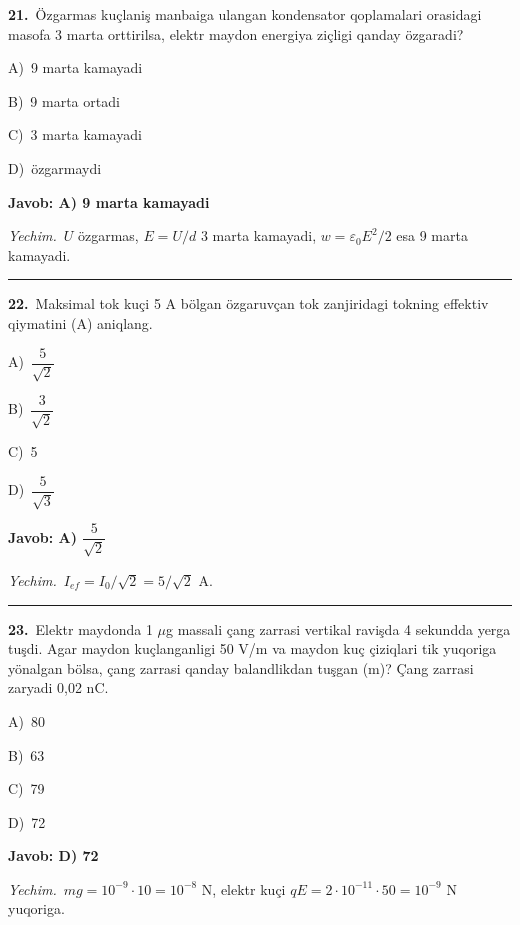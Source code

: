\documentclass[11pt,a4paper]{article}
\newcommand{\opt}[2]{\hspace*{4mm}#1)\ #2\par}
\begin{document}
\noindent\begin{minipage}{\linewidth}
\textbf{21.}\ Özgarmas kuçlaniş manbaiga ulangan kondensator qoplamalari orasidagi masofa 3 marta orttirilsa, elektr maydon energiya ziçligi qanday özgaradi?\par\smallskip
\opt{A}{9 marta kamayadi}
\opt{B}{9 marta ortadi}
\opt{C}{3 marta kamayadi}
\opt{D}{özgarmaydi}
\end{minipage}\vspace{2pt}\par
\noindent\colorbox{gray!12}{\parbox{\dimexpr\linewidth-2\fboxsep}{\textbf{Javob: A) 9 marta kamayadi}}}\par\smallskip
\noindent\textit{Yechim.}\ $U$ özgarmas, $E=U/d$ 3 marta kamayadi, $w=\varepsilon_0E^2/2$ esa 9 marta kamayadi.\par\par\medskip\hrule\medskip
{}\noindent\begin{minipage}{\linewidth}
\textbf{22.}\ Maksimal tok kuçi 5 A bölgan özgaruvçan tok zanjiridagi tokning effektiv qiymatini (A) aniqlang.\par\smallskip
\opt{A}{$\dfrac{5}{\sqrt{2}}$}
\opt{B}{$\dfrac{3}{\sqrt{2}}$}
\opt{C}{5}
\opt{D}{$\dfrac{5}{\sqrt{3}}$}
\end{minipage}\vspace{2pt}\par
\noindent\colorbox{gray!12}{\parbox{\dimexpr\linewidth-2\fboxsep}{\textbf{Javob: A) $\dfrac{5}{\sqrt{2}}$}}}\par\smallskip
\noindent\textit{Yechim.}\ $I_{ef}=I_0/\sqrt2=5/\sqrt2$ A.\par\par\medskip\hrule\medskip
{}\noindent\begin{minipage}{\linewidth}
\textbf{23.}\ Elektr maydonda 1 $\mu$g massali çang zarrasi vertikal ravişda 4 sekundda yerga tuşdi. Agar maydon kuçlanganligi 50 V/m va maydon kuç çiziqlari tik yuqoriga yönalgan bölsa, çang zarrasi qanday balandlikdan tuşgan (m)? Çang zarrasi zaryadi 0,02 nC.\par\smallskip
\opt{A}{80}
\opt{B}{63}
\opt{C}{79}
\opt{D}{72}
\end{minipage}\vspace{2pt}\par
\noindent\colorbox{gray!12}{\parbox{\dimexpr\linewidth-2\fboxsep}{\textbf{Javob: D) 72}}}\par\smallskip
\noindent\textit{Yechim.}\ $mg=10^{-9}\cdot10=10^{-8}$ N, elektr kuçi $qE=2\cdot10^{-11}\cdot50=10^{-9}$ N yuqoriga.\par
\end{document}
